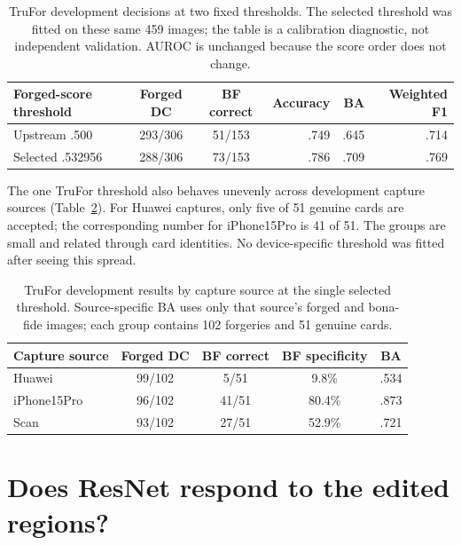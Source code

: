 \begin{table}[htbp]
\centering
\small
\setlength{\tabcolsep}{5pt}
\caption{TruFor development decisions at two fixed thresholds. The selected threshold was fitted on these same 459 images; the table is a calibration diagnostic, not independent validation. AUROC is unchanged because the score order does not change.}
\label{tab:clean-trufor-threshold}

\begin{tabular}{@{}l|cc|rrr@{}}
\toprule
Forged-score threshold & Forged DC & BF correct & Accuracy & BA & Weighted F1 \\
\midrule

Upstream .500 & 293/306 & 51/153 & .749 & .645 & .714 \\
Selected .532956 & 288/306 & 73/153 & .786 & .709 & .769 \\

\bottomrule
\end{tabular}
\end{table}

The one TruFor threshold also behaves unevenly across development capture sources (Table~\ref{tab:clean-trufor-device}). For Huawei captures, only five of 51 genuine cards are accepted; the corresponding number for iPhone15Pro is 41 of 51. The groups are small and related through card identities. No device-specific threshold was fitted after seeing this spread.

\begin{table}[htbp]
\centering\small
\caption{TruFor development results by capture source at the single selected threshold. Source-specific BA uses only that source's forged and bona-fide images; each group contains 102 forgeries and 51 genuine cards.}
\label{tab:clean-trufor-device}

\begin{tabular}{@{}l|cc|cc@{}}
\toprule
Capture source & Forged DC & BF correct & BF specificity & BA \\
\midrule
Huawei & 99/102 & 5/51 & 9.8\% & .534 \\
iPhone15Pro & 96/102 & 41/51 & 80.4\% & .873 \\
Scan & 93/102 & 27/51 & 52.9\% & .721 \\
\bottomrule
\end{tabular}
\end{table}

\section{Does ResNet respond to the edited regions?}
\label{sec:clean-regions}

